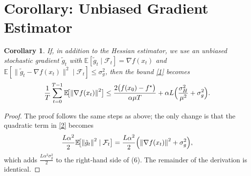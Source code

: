 \documentclass{article}
\newtheorem{corollary}{Corollary}
\newcommand{\E}{\mathbb{E}}
\newcommand{\norm}[1]{\left\lVert #1 \right\rVert}
\begin{document}
\section*{Corollary: Unbiased Gradient Estimator}
\begin{corollary}\label{cor:grad}
If, in addition to the Hessian estimator, we use an unbiased stochastic gradient $\tilde g_{t}$ with $\E[\tilde g_{t}\mid\mathcal{F}_{t}]=\nabla f(x_{t})$ and $\E[\|\tilde g_{t}-\nabla f(x_{t})\|^{2}\mid\mathcal{F}_{t}]\le\sigma_{g}^{2}$, then the bound \eqref{1} becomes
\[
\frac{1}{T}\sum_{t=0}^{T-1}\E\!\bigl[\norm{\nabla f(x_{t})}^{2}\bigr]
\le
\frac{2\bigl(f(x_{0})-f^{\star}\bigr)}{\alpha\mu T}
+\alpha L\Bigl(\frac{\sigma_{H}^{2}}{\mu^{2}}+\sigma_{g}^{2}\Bigr).
\]
\end{corollary}
\begin{proof}
The proof follows the same steps as above; the only change is that the quadratic term in \eqref{2} becomes
\[
\frac{L\alpha^{2}}{2}\E\!\bigl[\norm{\tilde g_{t}}^{2}\mid\mathcal{F}_{t}\bigr]
=\frac{L\alpha^{2}}{2}\Bigl(\norm{\nabla f(x_{t})}^{2}+\sigma_{g}^{2}\Bigr),
\]
which adds $\frac{L\alpha^{2}\sigma_{g}^{2}}{2}$ to the right‑hand side of (6). The remainder of the derivation is identical. \hfill\qedsymbol
\end{proof}
\end{document}
